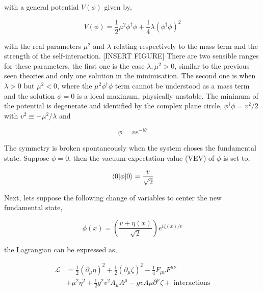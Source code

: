 with a general potential $V(\phi)$ given by,

\begin{equation}
    V(\phi) = \frac{1}{2}\mu^2\phi^\dag\phi + \frac{1}{4}\lambda(\phi^\dag\phi)^2
\end{equation}

with the real parameters $\mu^2$ and $\lambda$ relating respectively to the mass term and the strength of the self-interaction. [INSERT FIGURE] There are two sensible ranges for these parameters, the first one is the case $\lambda,\mu^2>0$, similar to the previous seen theories and only one solution in the minimisation. The second one is when $\lambda>0$ but $\mu^2<0$, where the $\mu^2\phi^\dag\phi$ term cannot be understood as a mass term and the solution $\phi=0$ is a local maximum, physically unstable. The minimum of the potential is degenerate and identified by the complex plane circle, $\phi^\dag\phi=v^2/2$ with $v^2\equiv-\mu^2/\lambda$ and

\begin{equation}
    \phi = v e^{-i\theta}
\end{equation}

The symmetry is broken spontaneously when the system choses the fundamental state. Suppose $\phi=0$, then the vacuum expectation value (VEV) of $\phi$ is set to,

\begin{equation}
    \expval{\phi}{0} = \frac{v}{\sqrt{2}}
\end{equation}

Next, lets suppose the following change of variables to center the new fundamental state,

\begin{equation}
    \phi(x)=\left( \frac{v+\eta(x)}{\sqrt{2}} \right) e^{i\zeta(x)/v}
\end{equation}

the Lagrangian can be expressed as,

\begin{equation}
\begin{split}
\mathcal{L} &= \frac{1}{2}(\partial_\mu\eta)^2 + \frac{1}{2}(\partial_\mu\zeta)^2 - \frac{1}{4}F_{\mu\nu}F^{\mu\nu}\\
&+\mu^2\eta^2 + \frac{1}{2}g^2v^2A_\mu A^\mu - gv A\mu \partial^\mu\zeta +\ \text{interactions}
\end{split}
\end{equation}

